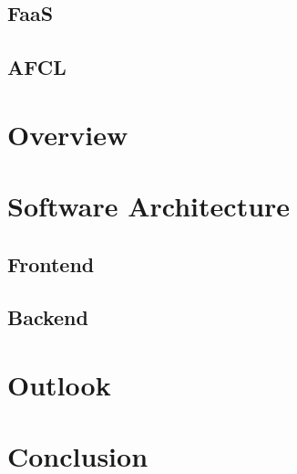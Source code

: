 \documentclass[a4paper,11pt,pdftex,halfparskip,cleardoubleempty]{scrbook}
\begin{document}
\subsection{FaaS}
\subsection{AFCL}

\section{Overview}


\section{Software Architecture}


\subsection{Frontend}
\subsection{Backend}


\section{Outlook}



\section{Conclusion}


\nocite{*}



\end{document}
